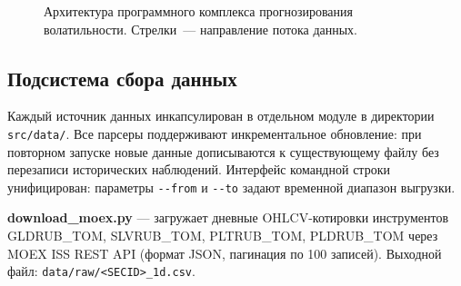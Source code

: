 \begin{figure}[H]
{%
}%
\caption{Архитектура программного комплекса прогнозирования волатильности.
         Стрелки~--- направление потока данных.}
\label{fig:architecture}
\end{figure}

\subsection{Подсистема сбора данных}

Каждый источник данных инкапсулирован в отдельном модуле
в директории \texttt{src/data/}.
Все парсеры поддерживают инкрементальное обновление:
при повторном запуске новые данные дописываются к существующему файлу
без перезаписи исторических наблюдений.
Интерфейс командной строки унифицирован: параметры \texttt{-{}-from}
и \texttt{-{}-to} задают временной диапазон выгрузки.

\textbf{download\_moex.py} --- загружает дневные OHLCV-котировки
инструментов GLDRUB\_TOM, SLVRUB\_TOM, PLTRUB\_TOM, PLDRUB\_TOM
через MOEX ISS REST API (формат JSON, пагинация по 100 записей).
Выходной файл: \texttt{data/raw/<SECID>\_1d.csv}.

